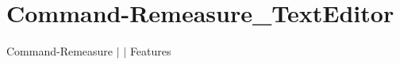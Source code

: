 \chapter{Command-\/\+Remeasure\+\_\+\+Text\+Editor }
\hypertarget{md__docs_2_text_editor_2_features_2_command-_remeasure___text_editor}{}\label{md__docs_2_text_editor_2_features_2_command-_remeasure___text_editor}
Command-\/\+Remeasure \texorpdfstring{$\vert$}{|}  \texorpdfstring{$\vert$}{|} Features



 